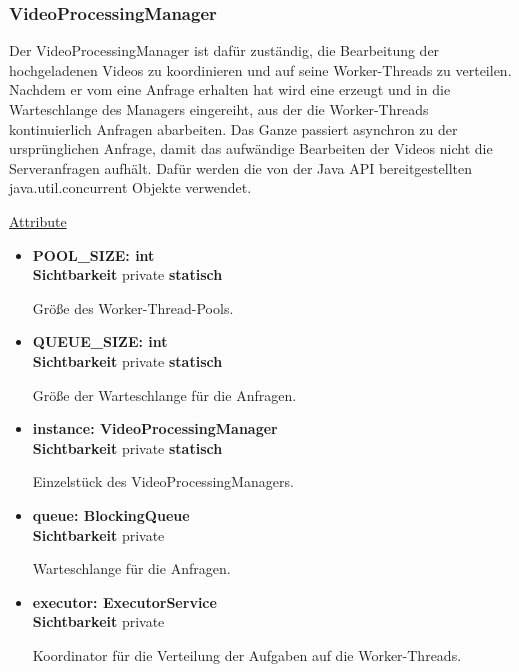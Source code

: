 \subsubsection{VideoProcessingManager} \label{service:klasse:VideoProcessingManager}
Der VideoProcessingManager ist dafür zuständig, die Bearbeitung der hochgeladenen Videos zu koordinieren und auf seine Worker-Threads zu verteilen. Nachdem er vom  eine Anfrage erhalten hat wird eine  erzeugt und in die Warteschlange des Managers eingereiht, aus der die Worker-Threads kontinuierlich Anfragen abarbeiten. Das Ganze passiert asynchron zu der ursprünglichen Anfrage, damit das aufwändige Bearbeiten der Videos nicht die Serveranfragen aufhält. Dafür werden die von der Java API bereitgestellten java.util.concurrent Objekte verwendet. \newline

\underline{Attribute}
\begin{itemize}
\itemsep0pt
\item \textbf{POOL\_SIZE: int} \hfill\\ 
\textbf{Sichtbarkeit} private \newline
\textbf{statisch}

Größe des Worker-Thread-Pools.

\item \textbf{QUEUE\_SIZE: int} \hfill\\ 
\textbf{Sichtbarkeit} private \newline
\textbf{statisch}

Größe der Warteschlange für die Anfragen.

\item \textbf{instance: VideoProcessingManager} \hfill\\
\textbf{Sichtbarkeit} private \newline
\textbf{statisch}

Einzelstück des VideoProcessingManagers.

\item \textbf{queue: BlockingQueue} \hfill\\
\textbf{Sichtbarkeit} private 

Warteschlange für die Anfragen.

\item \textbf{executor: ExecutorService} \hfill\\ 
\textbf{Sichtbarkeit} private

Koordinator für die Verteilung der Aufgaben auf die Worker-Threads.
\end{itemize}

